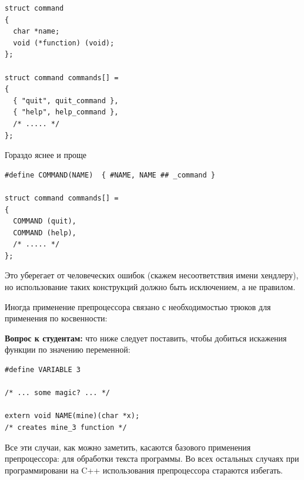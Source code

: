 \documentclass[a4paper,12pt,oneside]{article}
\newif\ifanswers
\begin{document}
\begin{lstlisting}
struct command
{
  char *name;
  void (*function) (void);
};
     
struct command commands[] =
{
  { "quit", quit_command },
  { "help", help_command },
  /* ..... */
};
\end{lstlisting}

Гораздо яснее и проще

\begin{lstlisting}
#define COMMAND(NAME)  { #NAME, NAME ## _command }
     
struct command commands[] =
{
  COMMAND (quit),
  COMMAND (help),
  /* ..... */
};
\end{lstlisting}

Это уберегает от человеческих ошибок (скажем несоответствия имени хендлеру), но использование таких конструкций должно быть исключением, а не правилом.

Иногда применение препроцессора связано с необходимостью трюков для применения по косвенности:

\textbf{Вопрос к студентам:} что ниже следует поставить, чтобы добиться искажения функции по значению переменной:

\begin{lstlisting}
#define VARIABLE 3

/* ... some magic? ... */

extern void NAME(mine)(char *x);
/* creates mine_3 function */
\end{lstlisting}

\ifanswers
Правильный ответ должен включать не менее трёх уровней косвенности:

\begin{lstlisting}
#define PASTER(x,y) x ## _ ## y
#define EVALUATOR(x,y)  PASTER(x,y)
#define NAME(fun) EVALUATOR(fun, VARIABLE)
\end{lstlisting}

Порядок расширения макросов следующий:

\begin{lstlisting}
NAME(mine)
EVALUATOR(mine, VARIABLE)
PASTER(mine, 3)
\end{lstlisting}

Поэтому пропустить хотя бы один уровень косвенности здесь нельзя.
\fi

Все эти случаи, как можно заметить, касаются базового применения препроцессора: для обработки текста программы. Во всех остальных случаях при программировани на C++ использования препроцессора стараются избегать.
\end{document}
